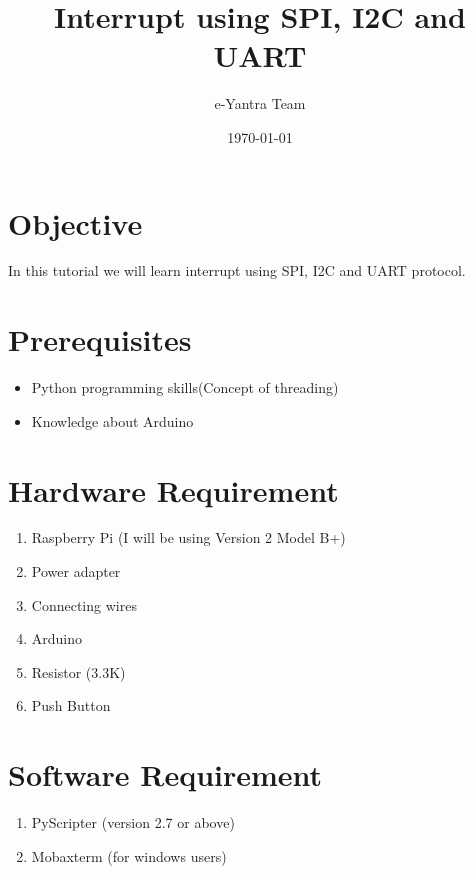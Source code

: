 \documentclass[11pt,a4paper]{article}
\title{Interrupt using SPI, I2C and UART}
\author{e-Yantra Team}
\date{\today}
\begin{document}
	\maketitle
	\newpage
	\tableofcontents
	\newpage
	\section{Objective}
	In this tutorial we will learn interrupt using SPI, I2C and UART protocol.
	\section{Prerequisites}
	\begin{itemize}
		\item Python programming skills(Concept of threading)
		\item Knowledge about Arduino
	\end{itemize}
	\section{Hardware Requirement}
		\begin{enumerate}
			\item Raspberry Pi (I will be using Version 2 Model B+)
			\item Power adapter
			\item Connecting wires
			\item Arduino
			\item Resistor (3.3K)
			\item Push Button
		\end{enumerate}
	\section{Software Requirement}
	\begin{enumerate}
		\item PyScripter (version 2.7 or above)
		\item Mobaxterm (for windows users)
	\end{enumerate}
	\newpage
\end{document}
